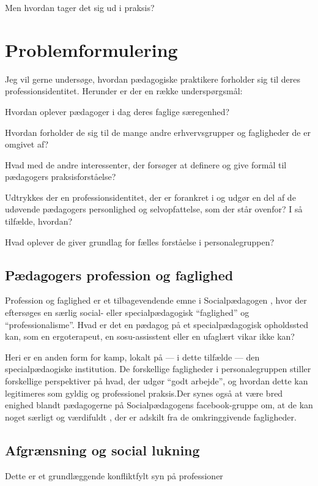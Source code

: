 
Men hvordan tager det sig ud i praksis?

\section{Problemformulering}
Jeg vil gerne undersøge, hvordan pædagogiske praktikere forholder sig til deres professionsidentitet.
Herunder er der en række underspørgsmål:

Hvordan oplever pædagoger i dag deres faglige særegenhed?

Hvordan forholder de sig til de mange andre erhvervsgrupper og fagligheder de er omgivet af?

Hvad med de andre interessenter, der forsøger at definere og give formål til pædagogers praksisforståelse?

Udtrykkes der en professionsidentitet, der er forankret i og udgør en del af de udøvende pædagogers personlighed og selvopfattelse, som der står ovenfor?
I så tilfælde, hvordan?

Hvad oplever de giver grundlag for fælles forståelse i personalegruppen?

\subsection{Pædagogers profession og faglighed}
Profession og faglighed er et tilbagevendende emne i Socialpædagogen \autocite[fx]{petersenHvadSigerEksperten2019}, hvor der eftersøges en særlig social- eller specialpædagogisk “faglighed” og “professionalisme”.
Hvad er det en pædagog på et specialpædagogisk opholdssted kan, som en ergoterapeut, en sosu-assisstent eller en ufaglært vikar ikke kan?

Heri er en anden form for kamp, lokalt på — i dette tilfælde — den specialpædaogiske institution.
De forskellige fagligheder i personalegruppen stiller forskellige perspektiver på hvad, der udgør “godt arbejde”, og hvordan dette kan legitimeres som gyldig og professionel praksis.Der synes også at være bred enighed blandt pædagogerne på Socialpædagogens facebook-gruppe om, at de kan noget særligt og værdifuldt \autocite{petersenSlagsMenneskeligAltmuligmand2019}, der er adskilt fra de omkringgivende fagligheder.

\subsection{Afgrænsning og social lukning}
Dette er et grundlæggende konfliktfylt syn på professioner 

